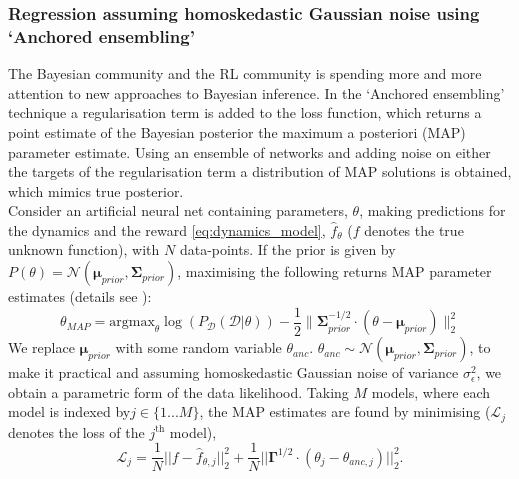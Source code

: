 \documentclass[
reprint,
amsmath,amssymb,amsfonts,clevref,
aps,
prstab,
]{revtex4-2}
\begin{document}
\subsubsection{Regression assuming homoskedastic Gaussian noise using `Anchored ensembling'}
The Bayesian community and the RL community is spending more and more attention to
new approaches to Bayesian inference. In the `Anchored ensembling' technique a regularisation
term is added to the loss function, which returns a point estimate of
the Bayesian posterior the maximum a posteriori (MAP) parameter estimate. 
Using an ensemble of networks and adding noise on either the targets of the regularisation term a distribution of MAP solutions  \cite{Gu2007, Chen2011, Bardsley2012, Pearce2018} is obtained, which mimics true posterior.\\
Consider an artificial neural net containing parameters, ${\theta}$, making predictions for the dynamics and the reward \cref{eq:dynamics_model}, $\hat{f}_\theta$ ($f$ denotes the true unknown function), with $N$ data-points. If the prior is given by $P(\theta) = \mathcal{N}(\pmb{\mu}_{prior}, \pmb{\Sigma}_{prior})$, maximising the following returns MAP parameter estimates (details see \cite{Pearce2018}):
\begin{equation}
	\label{eq_MAP_loglike_anc}
	{\theta}_{MAP}  = \text{argmax}_{{\theta}} \log( P_{\mathcal{D}}( \mathcal{D} | {\theta} ) ) - 
	\frac{1}{2} 
	\lVert \pmb{\Sigma}_{prior}^{-1/2} \cdot
	({\theta} - \pmb{\mu}_{prior}) \rVert^2_2
\end{equation}
We replace $\pmb{\mu}_{prior}$ with some random variable $ {\theta}_{anc}$.
${\theta}_{anc} \sim \mathcal{N}(\pmb{\mu}_{prior},\pmb{\Sigma}_{prior} )$, to make it practical and
assuming homoskedastic Gaussian noise of variance $\sigma^2_\epsilon$, we obtain a parametric form of the data likelihood. Taking $M$ models, where each model is indexed by$j \in \{1 ... M\}$, the MAP estimates are found by minimising ($\mathcal L_{j}$ denotes the loss of the $j^\text{th}$ model),
\begin{equation}
	\label{eqn_anch_loss_matrix}
	\mathcal L_{j} =  
	\frac{1}{N} \lvert \lvert f - \hat{f}_{\theta, j} \rvert \rvert ^2_2
	+ \frac{1}{N} \lvert \lvert \pmb{\Gamma}^{1/2} \cdot (\theta_j - \theta_{anc,j}) \rvert \rvert ^2_2.
\end{equation}
\end{document}
